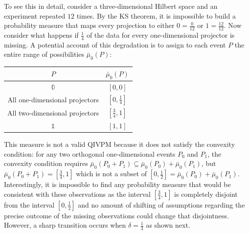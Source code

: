 \documentclass[english,reprint, aps, prl,superscriptaddress, showpacs,
showkeys, longbibliography, amsmath, amssymb, floatfix]{revtex4-1}
\theoremstyle{plain}
\theoremstyle{definition}
\newcommand{\imposs}{\ensuremath{\left[0,0\right]}}
\newcommand{\necess}{\ensuremath{\left[1,1\right]}}
\begin{document}
To see this in detail, consider a three-dimensional Hilbert space
and an experiment repeated $12$ times. By the KS theorem, it is impossible
to build a probability measure that maps every projection to either
$0=\frac{0}{12}$ or $1=\frac{12}{12}$. Now consider what happens
if $\frac{1}{4}$ of the data for every one-dimensional projector
is missing. A potential account of this degradation is to assign to
each event $P$ the entire range of possibilities $\bar{\mu}_{0}(P)$: 
\begin{center}
\begin{tabular}{cc}
\toprule 
\addlinespace
$P$  & $\bar{\mu}_{0}\left(P\right)$\tabularnewline
\midrule
\midrule 
\addlinespace
$\mathbb{0}$  & $\imposs$\tabularnewline
\midrule 
\addlinespace
All one-dimensional projectors  & $\left[0,\tfrac{1}{4}\right]$\tabularnewline
\midrule 
\addlinespace
All two-dimensional projectors  & $\left[\tfrac{3}{4},1\right]$\tabularnewline
\midrule 
\addlinespace
$\mathbb{1}$  & $\necess$\tabularnewline
\bottomrule
\end{tabular}
\par\end{center}

\noindent This measure is not a valid QIVPM because it does not satisfy
the convexity condition: for any two orthogonal one-dimensional events
$P_{0}$ and $P_{1}$, the convexity condition requires $\bar{\mu}_{0}\left(P_{0}+P_{1}\right)\subseteq\bar{\mu}_{0}\left(P_{0}\right)+\bar{\mu}_{0}\left(P_{1}\right)$,
but $\bar{\mu}_{0}\left(P_{0}+P_{1}\right)=\left[\tfrac{3}{4},1\right]$
which is not a subset of $\left[0,\tfrac{1}{2}\right]=\bar{\mu}_{0}\left(P_{0}\right)+\bar{\mu}_{0}\left(P_{1}\right)$.
Interestingly, it is impossible to find any probability measure that
would be consistent with these observations as the interval $\left[\tfrac{3}{4},1\right]$
is completely disjoint from the interval $\left[0,\tfrac{1}{2}\right]$
and no amount of shifting of assumptions regarding the precise outcome
of the missing observations could change that disjointness. However,
a sharp transition occurs when $\delta=\tfrac{1}{3}$ as shown next.

\end{document}
